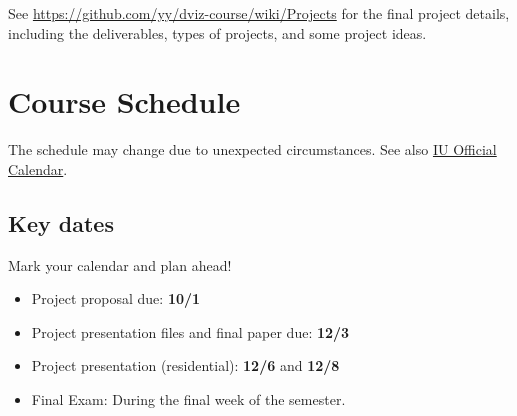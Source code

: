 \documentclass[11pt,article,oneside]{memoir} %
\begin{document}
See \url{https://github.com/yy/dviz-course/wiki/Projects} for the final project details, including the deliverables, types of projects, and some project ideas. 


\section{Course Schedule}%

The schedule may change due to unexpected circumstances. See also \href{https://registrar.indiana.edu/official-calendar/index.shtml}{IU Official Calendar}. 

\subsection{Key dates}\label{sub:key_dates} %

Mark your calendar and plan ahead!

\begin{itemize}%
\item Project proposal due: \textbf{10/1}
\item Project presentation files and final paper due: \textbf{12/3}
\item Project presentation (residential): \textbf{12/6} and \textbf{12/8} 
\item Final Exam: During the final week of the semester.
\end{itemize} %


\end{document}
